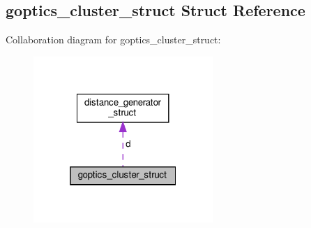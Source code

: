 \hypertarget{structgoptics__cluster__struct}{}\subsection{goptics\+\_\+cluster\+\_\+struct Struct Reference}
\label{structgoptics__cluster__struct}


Collaboration diagram for goptics\+\_\+cluster\+\_\+struct\+:\nopagebreak
\begin{figure}[H]
\begin{center}
\leavevmode
\includegraphics[width=193pt]{structgoptics__cluster__struct__coll__graph}
\end{center}
\end{figure}
